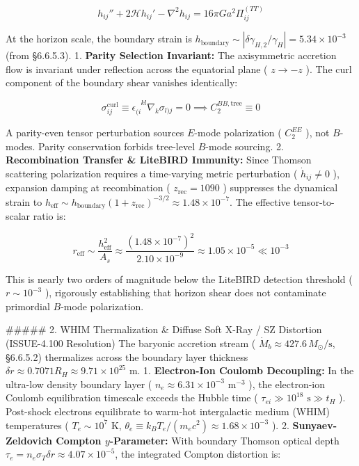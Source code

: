 \documentclass[11pt,a4paper]{article}
\theoremstyle{definition}
\theoremstyle{remark}
\begin{document}
\begin{equation}
h_{ij}'' + 2\mathcal{H} h_{ij}' - \nabla^2 h_{ij} = 16\pi G a^2 \Pi_{ij}^{(TT)}
\end{equation}


At the horizon scale, the boundary strain is $h_{\text{boundary}} \sim |\delta\gamma_{H, 2} / \gamma_H| = 5.34 \times 10^{-3}$ (from \S 6.6.5.3).
1. \textbf{Parity Selection Invariant:} The axisymmetric accretion flow is invariant under reflection across the equatorial plane ( $z \to -z$ ). The curl component of the boundary shear vanishes identically:


\begin{equation}
\sigma_{ij}^{\text{curl}} \equiv \epsilon_{(i}^{\phantom{(i}kl} \nabla_k \sigma_{l)j} = 0 \implies C_2^{BB, \text{tree}} \equiv 0
\end{equation}


A parity-even tensor perturbation sources $E$-mode polarization ( $C_2^{EE}$ ), not $B$-modes. Parity conservation forbids tree-level $B$-mode sourcing.
2. \textbf{Recombination Transfer \& LiteBIRD Immunity:} Since Thomson scattering polarization requires a time-varying metric perturbation ( $\dot{h}_{ij} \neq 0$ ), expansion damping at recombination ( $z_{\text{rec}} = 1090$ ) suppresses the dynamical strain to $h_{\text{eff}} \sim h_{\text{boundary}} (1 + z_{\text{rec}})^{-3/2} \approx 1.48 \times 10^{-7}$. The effective tensor-to-scalar ratio is:


\begin{equation}
r_{\text{eff}} \sim \frac{h_{\text{eff}}^2}{A_s} \approx \frac{(1.48 \times 10^{-7})^2}{2.10 \times 10^{-9}} \approx 1.05 \times 10^{-5} \ll 10^{-3}
\end{equation}


This is nearly two orders of magnitude below the LiteBIRD detection threshold ( $r \sim 10^{-3}$ ), rigorously establishing that horizon shear does not contaminate primordial $B$-mode polarization.

\#\#\#\#\# 2. WHIM Thermalization \& Diffuse Soft X-Ray / SZ Distortion (ISSUE-4.100 Resolution)
The baryonic accretion stream ( $\dot{M}_b \approx 427.6 \, M_\odot/\text{s}$, \S 6.6.5.2) thermalizes across the boundary layer thickness $\delta r \approx 0.7071 R_H \approx 9.71 \times 10^{25}\text{ m}$.
1. \textbf{Electron-Ion Coulomb Decoupling:} In the ultra-low density boundary layer ( $n_e \approx 6.31 \times 10^{-3}\text{ m}^{-3}$ ), the electron-ion Coulomb equilibration timescale exceeds the Hubble time ( $\tau_{ei} \gg 10^{18}\text{ s} \gg t_H$ ). Post-shock electrons equilibrate to warm-hot intergalactic medium (WHIM) temperatures ( $T_e \sim 10^7\text{ K}$, $\theta_e \equiv k_B T_e / (m_e c^2) \approx 1.68 \times 10^{-3}$ ).
2. \textbf{Sunyaev-Zeldovich Compton $y$-Parameter:} With boundary Thomson optical depth $\tau_e = n_e \sigma_T \delta r \approx 4.07 \times 10^{-5}$, the integrated Compton distortion is:
\end{document}
